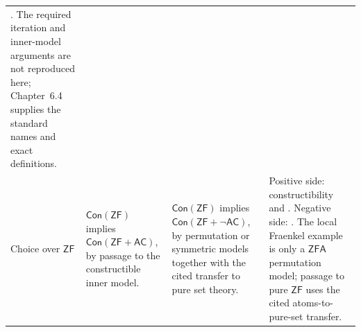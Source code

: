 \begin{landscape}
\begin{longtable}{@{}p{.85in}p{1.95in}p{2.10in}p{2.10in}@{}}
  \textcite{Jensen1972FineStructure}.  The required iteration and inner-model
  arguments are not reproduced here; Chapter~6.4 supplies the standard names
  and exact definitions. \\
\addlinespace
Choice over \(\mathsf{ZF}\)
& \(\mathsf{Con}(\mathsf{ZF})\) implies
  \(\mathsf{Con}(\mathsf{ZF}+\mathsf{AC})\), by passage to the
  constructible inner model.
& \(\mathsf{Con}(\mathsf{ZF})\) implies
  \(\mathsf{Con}(\mathsf{ZF}+\neg\mathsf{AC})\), by permutation or
  symmetric models together with the cited transfer to pure set theory.
& Positive side: constructibility and \textcite{Godel1938}.  Negative side:
  \textcite{Jech1973Choice,Halbeisen2017}.  The local Fraenkel example is only
  a \(\mathsf{ZFA}\) permutation model; passage to pure \(\mathsf{ZF}\) uses
  the cited atoms-to-pure-set transfer. \\
\bottomrule
\end{longtable}
\end{landscape}
